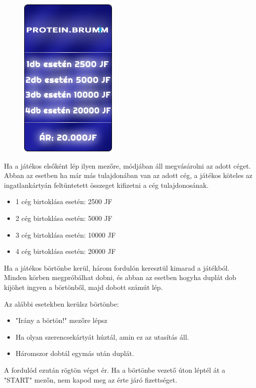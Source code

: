 \begin{figure}[h!]
\includegraphics[scale=0.4]{images/b4.png}
\label{fig:ff}
\end{figure}

Ha a játékos elsőként lép ilyen mezőre, módjában áll megvásárolni az adott céget. Abban az esetben ha már más tulajdonában van az adott cég, a játékos köteles az ingatlankártyán feltüntetett összeget kifizetni a cég tulajdonosának.

\begin{itemize}
\item 1 cég birtoklása esetén: 2500 JF
\item 2 cég birtoklása esetén: 5000 JF
\item 3 cég birtoklása esetén: 10000 JF
\item 4 cég birtoklása esetén: 20000 JF
\end{itemize}


Ha a játékos börtönbe kerül, három fordulón keresztül kimarad a játékból. Minden körben megpróbálhat dobni, és abban az esetben hogyha duplát dob kijöhet ingyen a börtönből, majd dobott számút lép.

Az alábbi esetekben kerülsz börtönbe:

\begin{itemize}
\item "Irány a börtön!" mezőre lépsz
\item Ha olyan szerencsekártyát húztál, amin ez az utasítás áll.
\item Háromszor dobtál egymás után duplát.
\end{itemize}

A fordulód ezután rögtön véget ér. Ha a börtönbe vezető úton léptél át a "START" mezőn, nem kapod meg az érte járó fizettséget.

